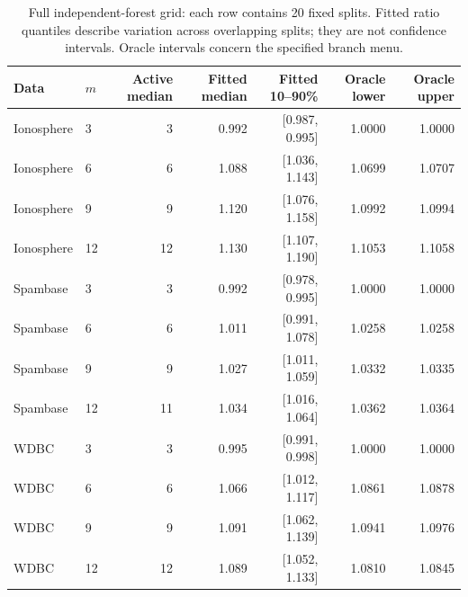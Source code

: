 \begin{table}[ht]
\centering
\caption{Full independent-forest grid: each row contains 20 fixed splits. Fitted ratio quantiles describe variation across overlapping splits; they are not confidence intervals. Oracle intervals concern the specified branch menu.}
\label{tab:forestdetail}
\small
\begin{tabular}{llrrrrr}
\toprule
Data & $m$ & Active median & Fitted median & Fitted 10--90\% & Oracle lower & Oracle upper \\
\midrule
Ionosphere & 3 & 3 & 0.992 & [0.987, 0.995] & 1.0000 & 1.0000 \\
Ionosphere & 6 & 6 & 1.088 & [1.036, 1.143] & 1.0699 & 1.0707 \\
Ionosphere & 9 & 9 & 1.120 & [1.076, 1.158] & 1.0992 & 1.0994 \\
Ionosphere & 12 & 12 & 1.130 & [1.107, 1.190] & 1.1053 & 1.1058 \\
Spambase & 3 & 3 & 0.992 & [0.978, 0.995] & 1.0000 & 1.0000 \\
Spambase & 6 & 6 & 1.011 & [0.991, 1.078] & 1.0258 & 1.0258 \\
Spambase & 9 & 9 & 1.027 & [1.011, 1.059] & 1.0332 & 1.0335 \\
Spambase & 12 & 11 & 1.034 & [1.016, 1.064] & 1.0362 & 1.0364 \\
WDBC & 3 & 3 & 0.995 & [0.991, 0.998] & 1.0000 & 1.0000 \\
WDBC & 6 & 6 & 1.066 & [1.012, 1.117] & 1.0861 & 1.0878 \\
WDBC & 9 & 9 & 1.091 & [1.062, 1.139] & 1.0941 & 1.0976 \\
WDBC & 12 & 12 & 1.089 & [1.052, 1.133] & 1.0810 & 1.0845 \\
\bottomrule
\end{tabular}
\end{table}
